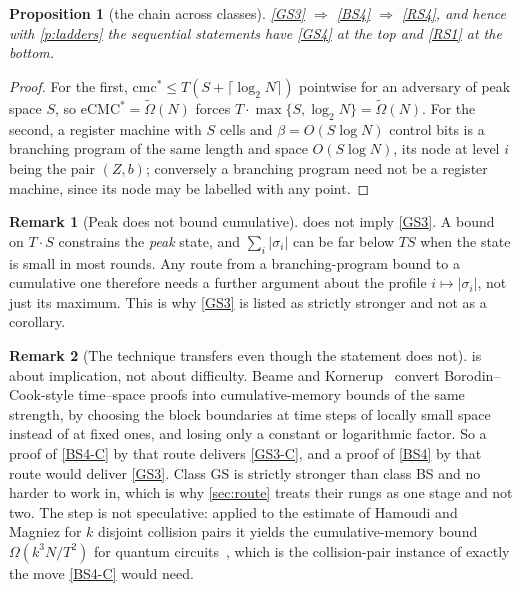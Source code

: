 \documentclass[11pt]{article}
\theoremstyle{plain}
\newtheorem{proposition}{Proposition}
\theoremstyle{definition}
\newtheorem{remark}{Remark}
\newcommand{\cmcs}{\mathrm{cmc}^{*}}
\newcommand{\eCMCs}{\mathrm{eCMC}^{*}}
\newcommand{\cls}[1]{\textsf{#1}}   %
\begin{document}
\begin{proposition}[the chain across classes]\label{p:chain}
\ref{GS3} $\Rightarrow$ \ref{BS4} $\Rightarrow$ \ref{RS4}, and hence with
\cref{p:ladders} the sequential statements have \ref{GS4} at the top and
\ref{RS1} at the bottom.
\end{proposition}

\begin{proof}
For the first, $\cmcs\leq T(S+\lceil\log_2 N\rceil)$ pointwise for an
adversary of peak space $S$, so $\eCMCs=\tilde\Omega(N)$ forces
$T\cdot\max\{S,\log_2 N\}=\tilde\Omega(N)$.  For the second, a register
machine with $S$ cells and $\beta=O(S\log N)$ control bits is a branching
program of the same length and space $O(S\log N)$, its node at level $i$
being the pair $(Z,b)$; conversely a branching program need not be a
register machine, since its node may be labelled with any point.
\end{proof}

\begin{remark}[Peak does not bound cumulative]\label{r:peak}
 does not imply \cref{GS3}.  A bound on $T \cdot S$ constrains
the \emph{peak} state, and $\sum_i |\sigma_i|$ can be far below $TS$ when
the state is small in most rounds.  Any route from a branching-program
bound to a cumulative one therefore needs a further argument about the
profile $i \mapsto |\sigma_i|$, not just its maximum.  This is why
\cref{GS3} is listed as strictly stronger and not as a corollary.
\end{remark}
\begin{remark}[The technique transfers even though the statement does not]\label{r:transfer}
 is about implication, not about difficulty.  Beame and
Kornerup~\cite{BK23} convert Borodin--Cook-style time--space proofs into
cumulative-memory bounds of the same strength, by choosing the block
boundaries at time steps of locally small space instead of at fixed ones,
and losing only a constant or logarithmic factor.  So a proof of
\cref{BS4-C} by that route delivers \cref{GS3-C}, and a proof of
\cref{BS4} by that route would deliver \cref{GS3}.  Class \cls{GS} is
strictly stronger than class \cls{BS} and no harder to work in, which is
why \cref{sec:route} treats their rungs as one stage and not two.  The step
is not speculative: applied to the estimate of Hamoudi and Magniez for $k$
disjoint collision pairs it yields the cumulative-memory bound
$\Omega(k^{3}N/T^{2})$ for quantum circuits~\cite{HM21,BK23}, which is the
collision-pair instance of exactly the move \cref{BS4-C} would need.
\end{remark}
\end{document}
